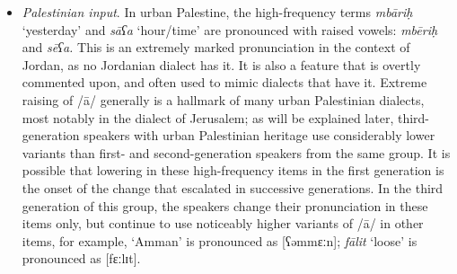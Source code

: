 \documentclass[output=paper]{langsci/langscibook}
\begin{document}
\begin{itemize}
\item \textit{Palestinian input}. In urban Palestine, the high-frequency terms \textit{mbāriḥ} `yesterday’ and \textit{sāʕa} ‘hour/time’ are pronounced with raised vowels: \textit{mbēriḥ} and \textit{sēʕa.} This is an extremely marked pronunciation in the context of Jordan, as no Jordanian dialect has it. It is also a feature that is overtly commented upon, and often used to mimic dialects that have it. Extreme raising of /ā/ generally is a hallmark of many urban Palestinian dialects, most notably in the dialect of Jerusalem; as will be explained later, third-generation speakers with urban Palestinian heritage use considerably lower variants than first- and second-generation speakers from the same group. It is possible that lowering in these high-frequency items in the first generation is the onset of the change that escalated in successive generations. In the third generation of this group, the speakers change their pronunciation in these items only, but continue to use noticeably higher variants of /ā/ in other items, for example, ‘Amman’ is pronounced as [ʕəmmɛːn]; \textit{fālit} ‘loose’ is pronounced as [fɛːlɪt].
\end{itemize}
\end{document}
